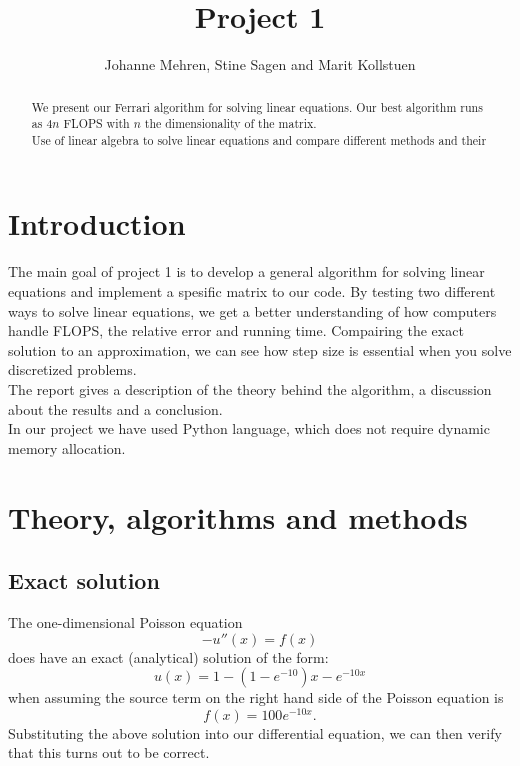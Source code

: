 \documentclass{article}
\title{Project 1}
\author{Johanne Mehren, Stine Sagen and Marit Kollstuen}
\begin{document}
\begin{abstract}
We present our Ferrari algorithm for solving linear equations. Our best algorithm runs as $4n$ FLOPS with $n$ the dimensionality of the matrix. \\
Use of linear algebra to solve linear equations and compare different methods and their 
\end{abstract}


\maketitle

\section{Introduction}
The main goal of project 1 is to develop a general algorithm for solving linear equations and implement a spesific matrix to our code. By testing two different ways to solve linear equations, we get a better understanding of how computers handle FLOPS, the relative error and running time. Compairing the exact solution to an approximation, we can see how step size is essential when you solve discretized problems. \\
The report gives a description of the theory behind the algorithm, a discussion about the results and a conclusion. \\ 
In our project we have used Python language, which does not require dynamic memory allocation. 


\section{Theory, algorithms and methods}
\subsection{Exact solution}
The one-dimensional Poisson equation \begin{equation} -u''(x) = f(x) \end{equation} does have an exact (analytical) solution of the form: \begin{equation} u(x) = 1 - (1-e^{-10})x - e^{-10x} \end{equation} when assuming the source term on the right hand side of the Poisson equation is \begin{equation} f(x) = 100e^{-10x}. \end{equation} Substituting the above solution into our differential equation, we can then verify that this turns out to be correct. 
\end{document}
